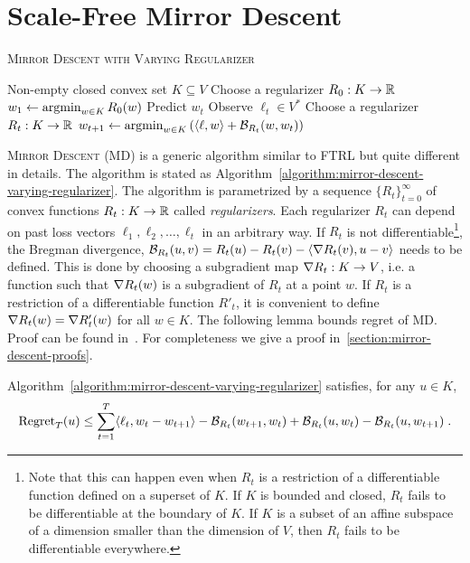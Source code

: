 \section{Scale-Free Mirror Descent}
\label{section:mirror-descent}

\begin{algorithm}[t]
\caption{\textsc{Mirror Descent with Varying Regularizer}}
\label{algorithm:mirror-descent-varying-regularizer}
\begin{algorithmic}[1]
\REQUIRE Non-empty closed convex set $K \subseteq V$
\STATE Choose a regularizer $R_0:K \to \mathbb{R}$
\STATE $w_1 \leftarrow \operatorname*{argmin}_{w \in K} R_0(w)$
\STATE Predict $w_t$
\STATE Observe $\ell_t \in V^*$
\STATE Choose a regularizer $R_t:K \to \mathbb{R}$
\STATE $w_{t+1} \leftarrow \operatorname*{argmin}_{w \in K} \left( \langle \ell, w \rangle + \mathcal{B}_{R_t}(w, w_t) \right)$
\ENDFOR
\end{algorithmic}
\end{algorithm}


\textsc{Mirror Descent} (MD) is a generic algorithm similar to \textsc{FTRL}
but quite different in details. The algorithm is stated as
Algorithm~\ref{algorithm:mirror-descent-varying-regularizer}. The algorithm is
parametrized by a sequence $\{R_t\}_{t=0}^\infty$ of convex functions $R_t:K
\to \mathbb{R}$ called \emph{regularizers}. Each regularizer $R_t$ can depend on past
loss vectors $\ell_1, \ell_2, \dots, \ell_t$ in an arbitrary way. If $R_t$ is
not differentiable\footnote{Note that this can happen even when $R_t$ is a
restriction of a differentiable function defined on a superset of $K$.  If $K$
is bounded and closed, $R_t$ fails to be differentiable at the boundary of $K$.
If $K$ is a subset of an affine subspace of a dimension smaller than the
dimension of $V$, then $R_t$ fails to be differentiable everywhere.}, the
Bregman divergence, $\mathcal{B}_{R_t}(u,v) = R_t(u) - R_t(v) - \langle \nabla R_t(v),
u - v \rangle$ needs to be defined. This is done by choosing a subgradient map
$\nabla R_t:K \to V$, i.e. a function such that $\nabla R_t(w)$ is a subgradient
of $R_t$ at a point $w$. If $R_t$ is a restriction of a differentiable function
$R'_t$, it is convenient to define $\nabla R_t(w) = \nabla R'_t(w)$ for all $w
\in K$. The following lemma bounds regret of \textsc{MD}.  Proof can be found
in~\cite{Rakhlin-Sridharan-2009,Duchi-Shalev-Shwartz-Singer-Tewari-2010}.  For
completeness we give a proof in~\ref{section:mirror-descent-proofs}.

\begin{lemma}
\label{lemma:mirror-descent-regret}
Algorithm~\ref{algorithm:mirror-descent-varying-regularizer} satisfies, for any
$u \in K$,
$$
\operatorname{Regret}_T(u)
\le
\sum_{t=1}^T \langle \ell_t, w_t - w_{t+1} \rangle - \mathcal{B}_{R_t}(w_{t+1}, w_t) + \mathcal{B}_{R_t}(u,w_t) - \mathcal{B}_{R_t}(u, w_{t+1}) \; .
$$
\end{lemma}

